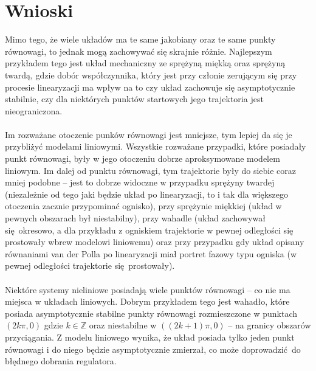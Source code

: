 \documentclass[a4paper, 10pt]{article}
\begin{document}
	\section{Wnioski}
		Mimo tego, że wiele układów ma te same jakobiany oraz te same punkty równowagi, to jednak mogą zachowywać się skrajnie różnie. Najlepszym przykładem tego jest układ mechaniczny ze sprężyną miękką oraz sprężyną twardą,
		gdzie dobór współczynnika, który jest przy członie zerującym się przy procesie linearyzacji ma wpływ na to czy układ zachowuje się asymptotycznie stabilnie, czy dla niektórych punktów startowych jego trajektoria jest
		nieograniczona.
		\\ \\
		Im rozważane otoczenie punków równowagi jest mniejsze, tym lepiej da się je przybliżyć modelami liniowymi. Wszystkie rozważane przypadki, które posiadały punkt równowagi, były w jego otoczeniu dobrze aproksymowane
		modelem liniowym. Im dalej od punktu równowagi, tym trajektorie były do siebie coraz mniej podobne -- jest to dobrze widoczne w przypadku sprężyny twardej (niezależnie od tego jaki będzie układ po linearyzacji, to i tak dla większego otoczenia zacznie przypominać ognisko), przy sprężynie miękkiej (układ w pewnych obszarach był niestabilny), przy wahadle (układ zachowywał się okresowo, a dla przykładu z ogniskiem trajektorie w pewnej odległości się prostowały wbrew modelowi liniowemu) oraz przy przypadku gdy układ opisany równaniami van der Polla po linearyzacji miał portret fazowy typu ogniska (w pewnej odległości trajektorie się prostowały).
		\\ \\
		Niektóre systemy nieliniowe posiadają wiele punktów równowagi -- co nie ma miejsca w układach liniowych. Dobrym przykładem tego jest wahadło, które posiada asymptotycznie stabilne punkty równowagi rozmieszczone w punktach
		$(2k\pi, 0)$ gdzie $k \in \mathbb{Z}$ oraz niestabilne w $((2k + 1)\pi, 0)$ -- na granicy obszarów przyciągania. Z modelu liniowego wynika, że układ posiada tylko jeden punkt równowagi i do niego będzie asymptotycznie
		zmierzał, co może doprowadzić do błędnego dobrania regulatora.
\end{document}
